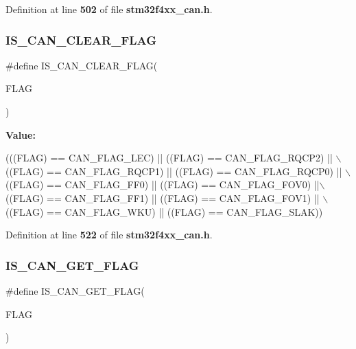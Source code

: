 Definition at line \textbf{ 502} of file \textbf{ stm32f4xx\+\_\+can.\+h}.

\mbox{\label{group__CAN__flags_gac46f5fb953efb6163cf3b2e33a514d0c}} 
\subsubsection{I\+S\+\_\+\+C\+A\+N\+\_\+\+C\+L\+E\+A\+R\+\_\+\+F\+L\+AG}
{\footnotesize\ttfamily \#define I\+S\+\_\+\+C\+A\+N\+\_\+\+C\+L\+E\+A\+R\+\_\+\+F\+L\+AG(\begin{DoxyParamCaption}\item[{}]{F\+L\+AG }\end{DoxyParamCaption})}

{\bfseries Value\+:}
\begin{DoxyCode}
(((FLAG) == CAN_FLAG_LEC) || ((FLAG) == CAN_FLAG_RQCP2) || \(\backslash\)
                                ((FLAG) == CAN_FLAG_RQCP1)  || ((FLAG) == 
      CAN_FLAG_RQCP0) || \(\backslash\)
                                ((FLAG) == CAN_FLAG_FF0)  || ((FLAG) == 
      CAN_FLAG_FOV0) ||\(\backslash\)
                                ((FLAG) == CAN_FLAG_FF1) || ((FLAG) == 
      CAN_FLAG_FOV1) || \(\backslash\)
                                ((FLAG) == CAN_FLAG_WKU) || ((FLAG) == 
      CAN_FLAG_SLAK))
\end{DoxyCode}


Definition at line \textbf{ 522} of file \textbf{ stm32f4xx\+\_\+can.\+h}.

\mbox{\label{group__CAN__flags_ga38d33d1762ed3a331d214cdb3249866e}} 
\subsubsection{I\+S\+\_\+\+C\+A\+N\+\_\+\+G\+E\+T\+\_\+\+F\+L\+AG}
{\footnotesize\ttfamily \#define I\+S\+\_\+\+C\+A\+N\+\_\+\+G\+E\+T\+\_\+\+F\+L\+AG(\begin{DoxyParamCaption}\item[{}]{F\+L\+AG }\end{DoxyParamCaption})}

